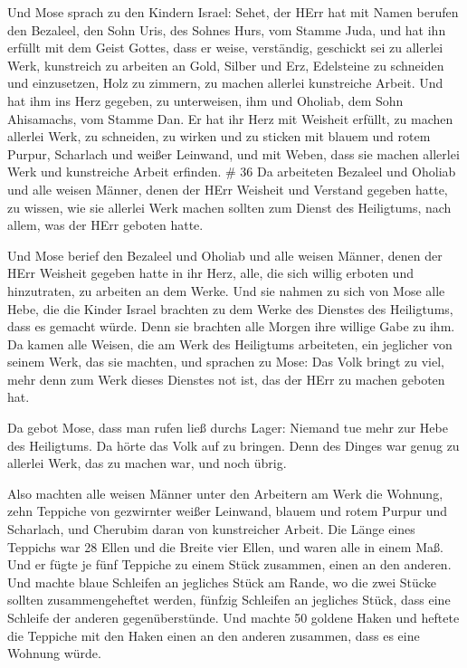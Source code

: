  Und Mose sprach zu den Kindern Israel: Sehet, der HErr hat
mit Namen berufen den Bezaleel, den Sohn Uris, des Sohnes Hurs, vom
Stamme Juda,  und hat ihn erfüllt mit dem Geist Gottes,
dass er weise, verständig, geschickt sei zu allerlei Werk, 
kunstreich zu arbeiten an Gold, Silber und Erz,  Edelsteine
zu schneiden und einzusetzen, Holz zu zimmern, zu machen allerlei
kunstreiche Arbeit.  Und hat ihm ins Herz gegeben, zu
unterweisen, ihm und Oholiab, dem Sohn Ahisamachs, vom Stamme Dan.
 Er hat ihr Herz mit Weisheit erfüllt, zu machen allerlei
Werk, zu schneiden, zu wirken und zu sticken mit blauem und rotem
Purpur, Scharlach und weißer Leinwand, und mit Weben, dass sie machen
allerlei Werk und kunstreiche Arbeit erfinden. \# 36  Da
arbeiteten Bezaleel und Oholiab und alle weisen Männer, denen der HErr
Weisheit und Verstand gegeben hatte, zu wissen, wie sie allerlei Werk
machen sollten zum Dienst des Heiligtums, nach allem, was der HErr
geboten hatte.

 Und Mose berief den Bezaleel und Oholiab und alle weisen
Männer, denen der HErr Weisheit gegeben hatte in ihr Herz, alle, die
sich willig erboten und hinzutraten, zu arbeiten an dem Werke.
 Und sie nahmen zu sich von Mose alle Hebe, die die Kinder
Israel brachten zu dem Werke des Dienstes des Heiligtums, dass es
gemacht würde. Denn sie brachten alle Morgen ihre willige Gabe zu ihm.
 Da kamen alle Weisen, die am Werk des Heiligtums
arbeiteten, ein jeglicher von seinem Werk, das sie machten, 
und sprachen zu Mose: Das Volk bringt zu viel, mehr denn zum Werk dieses
Dienstes not ist, das der HErr zu machen geboten hat.

 Da gebot Mose, dass man rufen ließ durchs Lager: Niemand
tue mehr zur Hebe des Heiligtums. Da hörte das Volk auf zu bringen.
 Denn des Dinges war genug zu allerlei Werk, das zu machen
war, und noch übrig.

 Also machten alle weisen Männer unter den Arbeitern am Werk
die Wohnung, zehn Teppiche von gezwirnter weißer Leinwand, blauem und
rotem Purpur und Scharlach, und Cherubim daran von kunstreicher Arbeit.
 Die Länge eines Teppichs war 28 Ellen und die Breite vier
Ellen, und waren alle in einem Maß.  Und er fügte je fünf
Teppiche zu einem Stück zusammen, einen an den anderen. 
Und machte blaue Schleifen an jegliches Stück am Rande, wo die zwei
Stücke sollten zusammengeheftet werden,  fünfzig Schleifen
an jegliches Stück, dass eine Schleife der anderen gegenüberstünde.
 Und machte 50 goldene Haken und heftete die Teppiche mit
den Haken einen an den anderen zusammen, dass es eine Wohnung würde.

